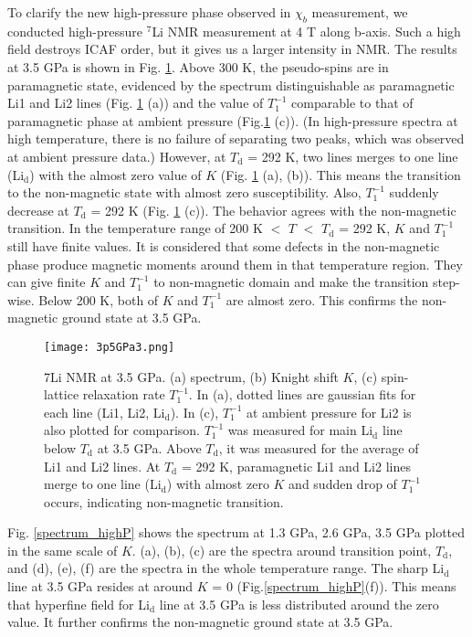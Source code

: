 To clarify the new high-pressure phase observed in $\chi_b$ measurement, we conducted high-pressure ${}^7$Li NMR measurement at 4 T along b-axis.
Such a high field destroys ICAF order, but it gives us a larger intensity in NMR.
The results at 3.5 GPa is shown in Fig. \ref{3.5GPa}.
Above 300 K, the pseudo-spins are in paramagnetic state, evidenced by the spectrum distinguishable as paramagnetic Li1 and Li2 lines (Fig. \ref{3.5GPa} (a))
and the value of $T^{-1}_1$ comparable to that of paramagnetic phase at ambient pressure (Fig.\ref{3.5GPa} (c)).
(In high-pressure spectra at high temperature, there is no failure of separating two peaks, which was observed at ambient pressure data.)
However, at $T_{\mathrm{d}}$ = 292 K, two lines merges to one line (Li$_\mathrm{d}$) with the almost zero value of $K$ (Fig. \ref{3.5GPa} (a), (b)).
This means the transition to the non-magnetic state with almost zero susceptibility.
Also, $T^{-1}_1$ suddenly decrease at $T_{\mathrm{d}}$ = 292 K (Fig. \ref{3.5GPa} (c)).
The behavior agrees with the non-magnetic transition.
In the temperature range of 200 K $<$ $T$ $<$ $T_{\mathrm{d}}$ = 292 K, $K$ and $T^{-1}_1$ still have finite values.
It is considered that some defects in the non-magnetic phase produce magnetic moments around them in that temperature region.
They can give finite $K$ and $T^{-1}_1$ to non-magnetic domain and make the transition step-wise.
Below 200 K, both of $K$ and $T^{-1}_1$ are almost zero.
This confirms the non-magnetic ground state at 3.5 GPa.

\begin{figure}[H]
  \centering
  \texttt{[image: 3p5GPa3.png]}
  \caption{7Li NMR at 3.5 GPa. (a) spectrum, (b) Knight shift $K$, (c) spin-lattice relaxation rate $T^{-1}_1$.
  In (a), dotted lines are gaussian fits for each line (Li1, Li2, Li$_\mathrm{d}$).
  In (c), $T^{-1}_1$ at ambient pressure for Li2 is also plotted for comparison.
  $T^{-1}_1$ was measured for main Li$_\mathrm{d}$ line below $T_\mathrm{d}$ at 3.5 GPa.
  Above $T_\mathrm{d}$, it was measured for the average of Li1 and Li2 lines.
  At $T_{\mathrm{d}}$ = 292 K, paramagnetic Li1 and Li2 lines merge to one line (Li$_\mathrm{d}$)
  with almost zero $K$ and sudden drop of $T^{-1}_1$ occurs, indicating non-magnetic transition. }
  \label{3.5GPa}
\end{figure}

Fig. \ref{spectrum_highP} shows the spectrum at 1.3 GPa, 2.6 GPa, 3.5 GPa plotted in the same scale of $K$.
(a), (b), (c) are the spectra around transition point, $T_\mathrm{d}$, and (d), (e), (f) are the spectra in the whole temperature range.
The sharp Li$_\mathrm{d}$ line at 3.5 GPa resides at around $K$ = 0 (Fig.\ref{spectrum_highP}(f)).
This means that hyperfine field for Li$_\mathrm{d}$ line at 3.5 GPa is less distributed around the zero value.
It further confirms the non-magnetic ground state at 3.5 GPa.

